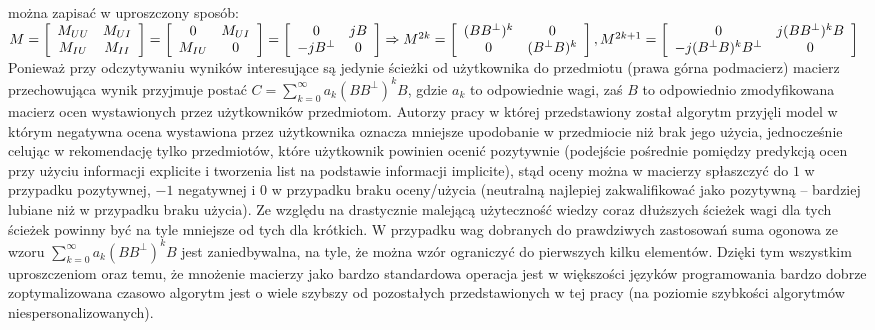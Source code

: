 \documentclass{pracamgr}
\begin{document}
    można zapisać w uproszczony sposób:\newline
    $M=
     \left[\begin{array}{cc}
     M_{UU}&M_{UI}\\
     M_{IU}&M_{II}
     \end{array}\right]
     =
     \left[\begin{array}{cc}
     0&M_{UI}\\
     M_{IU}&0
     \end{array}\right]
     =
     \left[\begin{array}{cc}
     0&jB\\
     -jB^\bot&0
     \end{array}\right]
     \Rightarrow\newline
     M^{2k}=
     \left[\begin{array}{cc}
     (BB^\bot)^k&0\\
     0&(B^\bot B)^k
     \end{array}\right],
     M^{2k+1}=
     \left[\begin{array}{cc}
     0&j(BB^\bot)^kB\\
     -j(B^\bot B)^kB^\bot&0
     \end{array}\right]
    $\newline
    Ponieważ przy odczytywaniu wyników interesujące są jedynie ścieżki od użytkownika do przedmiotu (prawa górna podmacierz)
    macierz przechowująca wynik przyjmuje postać $C=\sum\limits_{k=0}^{\infty}a_k(BB^\bot)^kB$, gdzie $a_k$ to odpowiednie wagi,
    zaś $B$ to odpowiednio zmodyfikowana macierz ocen wystawionych przez użytkowników przedmiotom.
    Autorzy pracy w której przedstawiony został algorytm przyjęli model w którym negatywna ocena wystawiona przez użytkownika
    oznacza mniejsze upodobanie w przedmiocie niż brak jego użycia, jednocześnie celując w rekomendację tylko przedmiotów,
    które użytkownik powinien ocenić pozytywnie (podejście pośrednie pomiędzy predykcją ocen przy użyciu informacji explicite
    i tworzenia list na podstawie informacji implicite), stąd oceny można w macierzy spłaszczyć do $1$ w przypadku pozytywnej, $-1$ negatywnej
    i $0$ w przypadku braku oceny/użycia (neutralną najlepiej zakwalifikować jako pozytywną -- bardziej lubiane niż w przypadku braku użycia).
    Ze względu na drastycznie malejącą użyteczność wiedzy coraz dłuższych ścieżek wagi dla tych ścieżek powinny być na tyle mniejsze od tych dla krótkich.
    W przypadku wag dobranych do prawdziwych zastosowań suma ogonowa ze wzoru $\sum\limits_{k=0}^{\infty}a_k(BB^\bot)^kB$ jest zaniedbywalna, na tyle,
    że można wzór ograniczyć do pierwszych kilku elementów.\newline
    Dzięki tym wszystkim uproszczeniom oraz temu,
    że mnożenie macierzy jako bardzo standardowa operacja jest w większości języków programowania bardzo dobrze zoptymalizowana czasowo algorytm
    jest o wiele szybszy od pozostałych przedstawionych w tej pracy (na poziomie szybkości algorytmów niespersonalizowanych).
\end{document}
